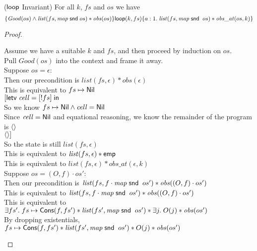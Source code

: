 \begin{lemma}{($\mathsf{loop}$ Invariant)}
For all $k$, $fs$  and $os$ we have
\begin{displaymath}
\{{\mathit{Good}(os) \land \mathit{list}(fs, \mathit{map}\;\mathsf{snd}\;os) * \mathit{obs}(os)}\}{\mathsf{loop}(k, fs)}\{{a:1}.\;{\mathit{list}(fs, \mathit{map}\;\mathsf{snd}\;\;os) * \mathit{obs\_at}(os, k)}\}
\end{displaymath}
\end{lemma}
\begin{proof}
\begin{tabbedproof}
\oo Assume we have a suitable $k$ and $fs$, and then proceed by induction on $os$.  \\
\oo Pull $\mathit{Good}(os)$ into the context and frame it away. \\
\oo Suppose $os = \epsilon$:  \\
\ooo Then our precondition is $\mathit{list}(fs, \epsilon) * \mathit{obs}(\epsilon)$ \\
\ooo This is equivalent to $fs \mapsto \mathsf{Nil}$ \\
\ooo $[\mathsf{letv}\;\mathit{cell} = [!fs]\;\mathsf{in}\;$  \\
\ooo So we know $fs \mapsto \mathsf{Nil} \land \mathit{cell} = \mathsf{Nil}$ \\
\ooo Since $\mathit{cell} = \mathsf{Nil}$ and equational reasoning, we know the remainder of the program is $\left<\right>$\\
\ooo $\left<\right>]$ \\
\ooo So the state is still $\mathit{list}(fs, \epsilon)$ \\
\ooo This is equivalent to $\mathit{list}(fs, \epsilon) * \mathsf{emp}$ \\
\ooo This is equivalent to $\mathit{list}(fs, \epsilon) * \mathit{obs\_at}(\epsilon, k)$ \\
\oo Suppose $os = (O,f) \cdot os'$:  \\
\ooo Then our precondition is $\mathit{list}(fs, f \cdot \mathit{map}\;\mathsf{snd}\;\;os') * \mathit{obs}((O,f)\cdot os')$ \\
\ooo This is equivalent to $\mathit{list}(fs, f \cdot \mathit{map}\;\mathsf{snd}\;\; os') * \mathit{obs}((O,f)\cdot os')$ \\
\ooo This is equivalent to $\exists fs'.\; fs \mapsto \mathsf{Cons}(f, fs') * \mathit{list}(fs',  \mathit{map}\;\mathsf{snd}\;\; os') * \exists j.\;O(j) * \mathit{obs}( os')$ \\
\ooo By dropping existentials, $fs \mapsto \mathsf{Cons}(f, fs') * \mathit{list}(fs',  \mathit{map}\;\mathsf{snd}\;\;os') * O(j) * \mathit{obs}( os')$ \\

\end{tabbedproof}
\end{proof}
